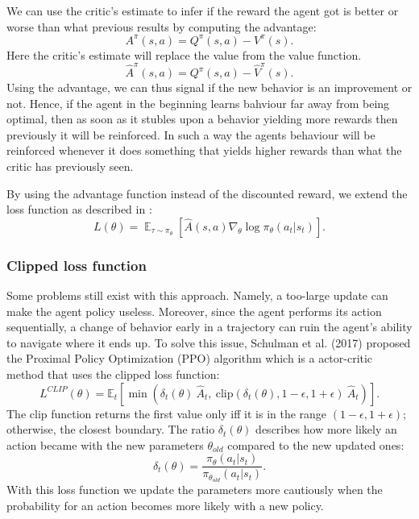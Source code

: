 \documentclass[12pt,A4]{report}
\theoremstyle{definition}
\begin{document}

We can use the critic's estimate to infer if the reward the agent got is better or worse than what previous results by computing the advantage:
\[A^\pi(s,a) = Q^\pi(s, a) - V^\pi(s).\]
Here the critic's estimate will replace the value from the value function.
\[\hat{A}^\pi(s,a) = Q^\pi(s, a) - \hat{V}^\pi(s).\]
Using the advantage, we can thus signal if the new behavior is an improvement or not. Hence, if the agent in the beginning learns bahviour far away from being optimal, then as soon as it stubles upon a behavior yielding more rewards then previously it will be reinforced. In such a way the agents behaviour will be reinforced whenever it does something that yields higher rewards than what the critic has previously seen. 

By using the advantage function instead of the discounted reward, we extend the loss function as described in \citet{OpenAI}:
\[ L(\theta) = \mathop{\mathbb{E}}_{\tau \sim \pi_\theta} [\hat{A}(s,a) \nabla_\theta \log \pi_\theta (a_t|s_t) ]. \]

\subsubsection{Clipped loss function}
Some problems still exist with this approach. Namely, a too-large update can make the agent policy useless. Moreover, since the agent performs its action sequentially, a change of behavior early in a trajectory can ruin the agent's ability to navigate where it ends up. To solve this issue, Schulman et al. (2017) proposed the Proximal Policy Optimization (PPO) algorithm which is a actor-critic method that uses the clipped loss function:
\[L^{CLIP}(\theta) = \mathbb{E}_t \left [ \min(\delta_t(\theta) \ \hat{A}_t,\ 
\text{clip}(\delta_t(\theta), 1 - \epsilon, 1 + \epsilon) \ \hat{A}_t) \right ]. \]
The clip function returns the first value only iff it is in the range $(1-\epsilon, 1+\epsilon)$; otherwise, the closest boundary. The ratio $\delta_t(\theta)$ describes how more likely an action became with the new parameters $\theta_{old}$ compared to the new updated ones:
\[ \delta_t(\theta) = \frac{\pi_\theta(a_t| s_t)}{\pi_{\theta_{old}}(a_t|s_t)}. \]
With this loss function we update the parameters more cautiously when the probability for an action becomes more likely with a new policy. 
\end{document}
